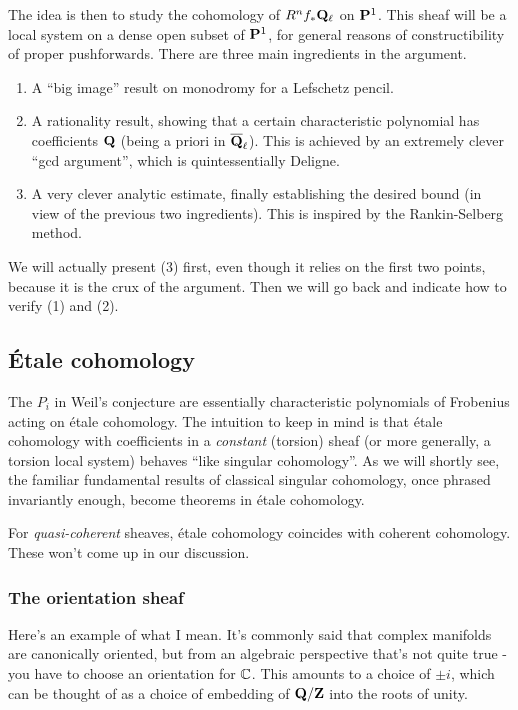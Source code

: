 The idea is then to study the cohomology of $R^n f_* \mathbf{Q}_{\ell}$ on $\mathbf{P}^1$. This sheaf will be a local system on a dense open subset of $\mathbf{P}^1$, for general reasons of constructibility of proper pushforwards. There are three main ingredients in the argument. 
\begin{enumerate}
\item A ``big image'' result on monodromy for a Lefschetz pencil. 
\item A rationality result, showing that a certain characteristic polynomial has coefficients $\mathbf{Q}$ (being a priori in $\overline{\mathbf{Q}}_{\ell}$). This is achieved by an extremely clever ``gcd argument'', which is quintessentially Deligne. 
\item A very clever analytic estimate, finally establishing the desired bound (in view of the previous two ingredients). This is inspired by the Rankin-Selberg method. 
\end{enumerate}
We will actually present (3) first, even though it relies on the first two points, because it is the crux of the argument. Then we will go back and indicate how to verify (1) and (2). 


\subsection{\'{E}tale cohomology}

The $P_i$ in Weil's conjecture are essentially characteristic polynomials of Frobenius acting on \'{e}tale cohomology. The intuition to keep in mind is that \'{e}tale cohomology with coefficients in a \emph{constant} (torsion) sheaf (or more generally, a torsion local system) behaves ``like singular cohomology''. As we will shortly see, the familiar fundamental results of classical singular cohomology, once phrased invariantly enough, become theorems in \'{e}tale cohomology. 

\begin{rem}
For \emph{quasi-coherent} sheaves, \'{e}tale cohomology coincides with coherent cohomology. These won't come up in our discussion. 
\end{rem}

\subsubsection{The orientation sheaf}
Here's an example of what I mean. It's commonly said that complex manifolds are canonically oriented, but from an algebraic perspective that's not quite true - you have to choose an orientation for $\mathbb{C}$. This amounts to a choice of $\pm i$, which can be thought of as a choice of embedding of $\mathbf{Q}/\mathbf{Z}$ into the roots of unity. 

